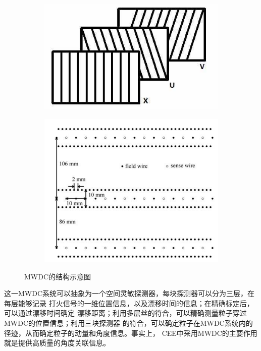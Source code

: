\documentclass[bachelor,openany,oneside,color]{buaathesis}
\begin{document}
\begin{figure}
	\centering
	\begin{subfigure}{0.4\textwidth}
		\includegraphics[width=\textwidth]{./resource/CEE-MWDC-Layer.jpg}
		\label{fig:det:MWDC:Layer}
	\end{subfigure}
	\begin{subfigure}{0.4\textwidth}
		\includegraphics[width=\textwidth]{./resource/CEE-MWDC-Layout.png}
		\label{fig:det:MWDC:Layout}
	\end{subfigure}
	\caption{MWDC的结构示意图\cite{Lyu:ConceptDesign}}\label{fig:det:MWDC}
\end{figure}

这一MWDC系统可以抽象为一个空间灵敏探测器，每块探测器可以分为三层，在每层能够记录
打火信号的一维位置信息，以及漂移时间的信息；在精确标定后，可以通过漂移时间确定
漂移距离；利用多层丝的符合，可以精确测量粒子穿过MWDC的位置信息；利用三块探测器
的符合，可以确定粒子在MWDC系统内的径迹，从而确定粒子的动量和角度信息。事实上，
CEE中采用MWDC的主要作用就是提供高质量的角度关联信息。
\end{document}
